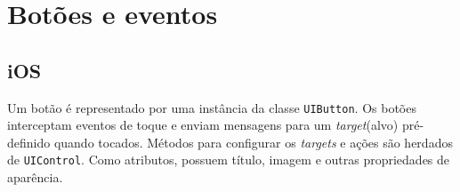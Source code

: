     \section {Botões e eventos}
     
    \subsection{iOS}
           
    Um botão é representado por uma instância da classe \texttt{UIButton}. Os botões interceptam eventos de toque e enviam mensagens para um \emph{target}(alvo) pré-definido quando tocados. Métodos para configurar os \emph{targets} e ações são herdados de \texttt{UIControl}. Como atributos, possuem título, imagem e outras propriedades de aparência.
     
